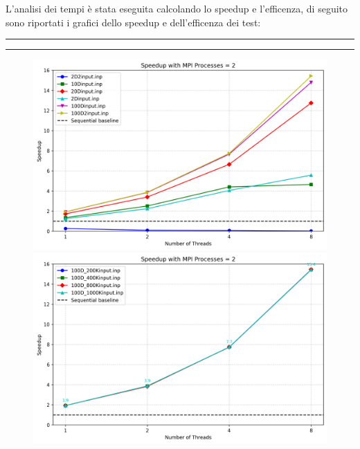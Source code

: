 \documentclass{article}
\begin{document}
  L'analisi dei tempi è stata eseguita calcolando lo speedup e l'efficenza, di seguito sono riportati i grafici dello speedup e dell'efficenza dei test:
  \begin{center}
    \rule{2.5cm}{1pt}  \rule{2.5cm}{1pt}
  \end{center}
  \begin{figure}[ht]
    \centering
    \begin{minipage}{0.4\textwidth}
      \centering
      \includegraphics[width=\linewidth]{../test_csv/plots/speedup/plot_omp_mpi_2_small_slurm.png}
    \end{minipage}
    \begin{minipage}{0.4\textwidth}
      \centering
      \includegraphics[width=\linewidth]{../test_csv/plots/speedup/plot_omp_mpi_2_big_slurm.png}
    \end{minipage}
    \begin{minipage}{0.4\textwidth}

\end{minipage}
\end{figure}
\end{document}
